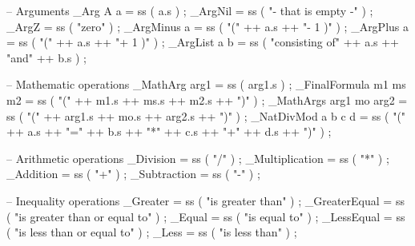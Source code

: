 \begin{lstgf}
{        -- Arguments
        _Arg A a                        = ss ( a.s ) ;
        _ArgNil                         = ss ( "- that is empty -" ) ;
        _ArgZ                           = ss ( "zero" ) ;
        _ArgMinus a                     = ss ( "(" ++ a.s ++ "- 1 )" ) ;
        _ArgPlus a                      = ss ( "(" ++ a.s ++ "+ 1 )" ) ;
        _ArgList a b                    = ss ( "consisting of" ++ a.s ++ "and" ++ b.s ) ;

        -- Mathematic operations
        _MathArg arg1                   = ss ( arg1.s ) ;
        _FinalFormula m1 ms m2          = ss ( "(" ++ m1.s ++ ms.s ++ m2.s ++ ")" ) ;
        _MathArgs arg1 mo arg2          = ss ( "(" ++ arg1.s ++ mo.s ++ arg2.s ++ ")" ) ;
        _NatDivMod a b c d              = ss ( "(" ++ a.s ++ "=" ++ b.s ++ "*" ++ c.s ++ "+" ++ d.s ++ ")" ) ;

        -- Arithmetic operations
        _Division                       = ss ( "/" ) ;
        _Multiplication                 = ss ( "*" ) ;
        _Addition                       = ss ( "+" ) ;
        _Subtraction                    = ss ( "-" ) ;

        -- Inequality operations
        _Greater                        = ss ( "is greater than" ) ;
        _GreaterEqual                   = ss ( "is greater than or equal to" ) ;
        _Equal                          = ss ( "is equal to" ) ;
        _LessEqual                      = ss ( "is less than or equal to" ) ;
        _Less                           = ss ( "is less than" ) ;

}
\end{lstgf}
